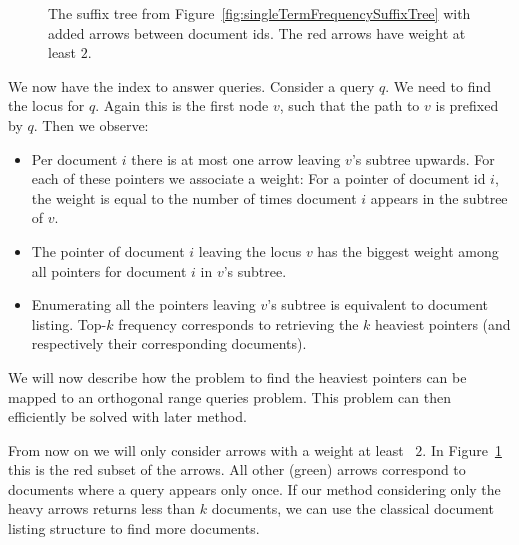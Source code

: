 \begin{Proof}
  \begin{figure}[htb]
    \centering
    
    \caption{The suffix tree from Figure~\ref{fig:singleTermFrequencySuffixTree} with added arrows between document ids. The red arrows have weight at least $2$.}
    \label{fig:singleTermFrequencySuffixTreeDocumentArrows}
  \end{figure}

  We now have the index to answer queries. Consider a query $q$. We need to find the locus for $q$. Again this is the first node $v$, such that the path to $v$ is prefixed by $q$. Then we observe:
  \begin{itemize}
    \item Per document $i$ there is at most one arrow leaving $v$'s subtree upwards. For each of these pointers we associate a weight: For a pointer of document id $i$, the weight is equal to the number of times document $i$ appears in the subtree of $v$.
    \item The pointer of document $i$ leaving the locus $v$ has the biggest weight among all pointers for document $i$ in $v$'s subtree.
    \item Enumerating all the pointers leaving $v$'s subtree is equivalent to document listing. Top-$k$ frequency corresponds to retrieving the $k$ heaviest pointers (and respectively their corresponding documents).
  \end{itemize}

  We will now describe how the problem to find the heaviest pointers can be mapped to an orthogonal range queries problem. This problem can then efficiently be solved with later method.

  From now on we will only consider arrows with a weight at least ~$2$. In Figure~\ref{fig:singleTermFrequencySuffixTreeDocumentArrows} this is the red subset of the arrows. All other (green) arrows correspond to documents where a query appears only once. If our method considering only the heavy arrows returns less than $k$ documents, we can use the classical document listing structure to find more documents.


\end{Proof}
